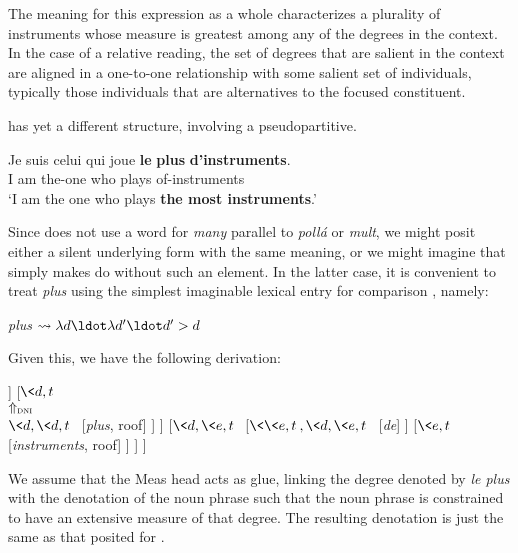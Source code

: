 \documentclass[output=paper
,modfonts
,nonflat]{langsci/langscibook}
\begin{document}
The meaning for this expression as a whole characterizes a plurality of instruments whose measure is greatest among any of the degrees in the context. In the case of a relative reading, the set of degrees that are salient in the context are aligned in a one-to-one relationship with some salient set of individuals, typically those individuals that are alternatives to the focused constituent.

 has yet a different structure, involving a pseudopartitive. 

\ea \label{ex:coppockstrand:102}
\gll Je suis celui qui joue \textbf{le} \textbf{plus} \textbf{d'instruments}. \\
I am the-one who plays  \cmpr{} of-instruments\\ 
\glt `I am the one who plays \textbf{the most instruments}.'
\z

Since  does not use a word for \textit{many} parallel to  \textit{poll\'a} or  \textit{mult}, we might posit either a silent underlying form with the same meaning, or we might imagine that  simply makes do without such an element. In the latter case, it is convenient to treat \textit{plus} using the simplest imaginable lexical entry for comparison \citep{Heim2006,Beck2010}, namely:

\ea \label{ex:coppockstrand:103}
\textit{plus} $\leadsto \lambda d \ldot \lambda d' \ldot d' > d$
\z 

Given this, we have the following derivation:

\ea \label{ex:coppockstrand:104} 
\begin{forest}
	[{$\<e,t\>$}
		[{$d$}
			[{$\<\<\tau,t\>,\tau\>$} [\textit{le}]
			]
			[{$\<d,t\>$\\$\Uparrow_{\textsc{dni}}$\\$\<d,\<d,t\>\>$} [\textit{plus}, roof]
			]
		]
		[{$\<d,\<e,t\>\>$}
			[{$\<\<e,t\>,\<d,\<e,t\>\>$} [\textit{de}]
			]
			[{$\<e,t\>$} [\textit{instruments}, roof]
			]
		]
	]
\end{forest}
\z 

We assume that the Meas head acts as glue, linking the degree denoted by \textit{le plus} with the denotation of the noun phrase such that the noun phrase is constrained to have an extensive measure of that degree. The resulting denotation is just the same as that posited for .
\end{document}
